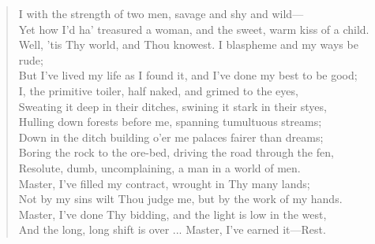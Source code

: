 \begin{verse}
I with the strength of two men, savage and shy and wild—\\
Yet how I'd ha' treasured a woman, and the sweet, warm kiss of a child.\\
Well, 'tis Thy world, and Thou knowest. I blaspheme and my ways be rude;\\
But I've lived my life as I found it, and I've done my best to be good;\\
I, the primitive toiler, half naked, and grimed to the eyes,\\
Sweating it deep in their ditches, swining it stark in their styes,\\
Hulling down forests before me, spanning tumultuous streams;\\
Down in the ditch building o'er me palaces fairer than dreams;\\
Boring the rock to the ore-bed, driving the road through the fen,\\
Resolute, dumb, uncomplaining, a man in a world of men.\\
Master, I've filled my contract, wrought in Thy many lands;\\
Not by my sins wilt Thou judge me, but by the work of my hands.\\
Master, I've done Thy bidding, and the light is low in the west,\\
And the long, long shift is over ... Master, I've earned it—Rest. 
\end{verse}

